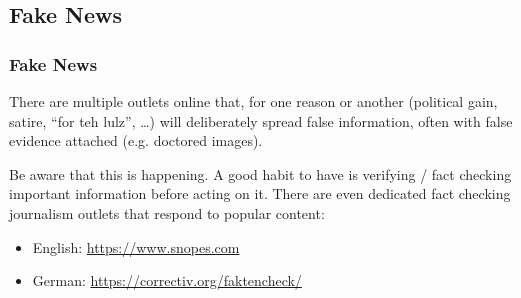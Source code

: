\documentclass[aspectratio=1610,dvipsnames]{beamer}
\begin{document}
\subsection{Fake News}

\begin{frame}
\frametitle{Fake News}

There are multiple outlets online that, for one reason or another (political gain, satire, ``for teh lulz'', \dots) will deliberately spread false information, often with false evidence attached (e.g. doctored images).
\pause\bigskip

Be aware that this is happening. A good habit to have is verifying / fact checking important information before acting on it. There are even dedicated fact checking journalism outlets that respond to popular content:
\medskip
\begin{itemize}
\item English: \url{https://www.snopes.com}
\item German: \url{https://correctiv.org/faktencheck/}
\end{itemize}

\end{frame}

\end{document}
